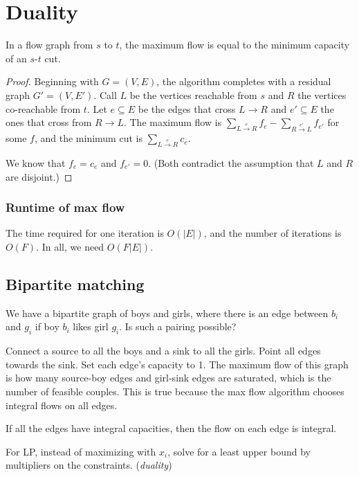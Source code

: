 \chapter{Duality}
\begin{theorem}
	In a flow graph from \(s\) to \(t\), the maximum flow is equal to the minimum capacity of an \(s\)-\(t\) cut.
\end{theorem}
\begin{proof}
	Beginning with \(G = (V, E)\), the algorithm completes with a residual graph \(G' = (V, E')\). Call \(L\) be the vertices reachable from \(s\) and \(R\) the vertices co-reachable from \(t\). Let \(e\subseteq E\) be the edges that cross \(L\to R\) and \(e' \subseteq E\) the ones that cross from \(R\to L\). The maximum flow is \(\sum_{L\xrightarrow{e}R} f_e - \sum_{R\xrightarrow{e'}L} f_{e'}\) for some \(f\), and the minimum cut is \(\sum_{L\xrightarrow{e}R} c_e\).
	
	We know that \(f_e = c_e\) and \(f_{e'} = 0\). (Both contradict the assumption that \(L\) and \(R\) are disjoint.)
\end{proof}

\subsection{Runtime of max flow}
The time required for one iteration is \(O\left(\left|E\right|\right)\), and the number of iterations is \(O(F)\). In all, we need \(O\left(F\left|E\right|\right)\).

\section{Bipartite matching}
We have a bipartite graph of boys and girls, where there is an edge between \(b_i\) and \(g_i\) if boy \(b_i\) likes girl \(g_i\).
Is such a pairing possible?

Connect a  source to all the boys and a sink to all the girls. Point all edges towards the sink. Set each edge's capacity to 1.
The maximum flow of this graph is how many source-boy edges and girl-sink edges are saturated, which is the number of feasible couples.
This is true because the max flow algorithm chooses integral flows on all edges.

\begin{theorem}
	If all the edges have integral capacities, then the flow on each edge is integral.
\end{theorem}

For LP, instead of maximizing with \(x_i\), solve for a least upper bound by multipliers on the constraints. (\emph{duality})


